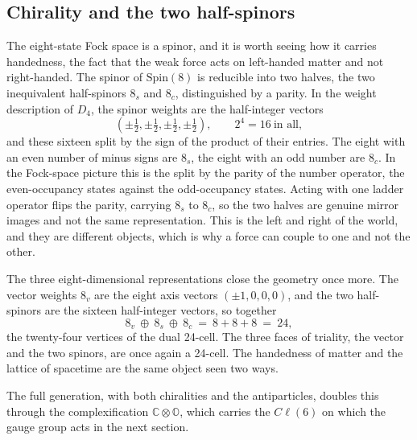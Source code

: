 \subsection{Chirality and the two half-spinors}

The eight-state Fock space is a spinor, and it is worth seeing how it carries handedness, the fact that the weak force
acts on left-handed matter and not right-handed. The spinor of $\mathrm{Spin}(8)$ is reducible into two halves, the two
inequivalent half-spinors $8_s$ and $8_c$, distinguished by a parity. In the weight description of $D_4$, the spinor
weights are the half-integer vectors
\begin{equation}
  \left( \pm\tfrac12, \pm\tfrac12, \pm\tfrac12, \pm\tfrac12 \right), \qquad 2^4 = 16 \ \text{in all},
\end{equation}
and these sixteen split by the sign of the product of their entries. The eight with an even number of minus signs are
$8_s$, the eight with an odd number are $8_c$. In the Fock-space picture this is the split by the parity of the number
operator, the even-occupancy states against the odd-occupancy states. Acting with one ladder operator flips the parity,
carrying $8_s$ to $8_c$, so the two halves are genuine mirror images and not the same representation. This is the
left and right of the world, and they are different objects, which is why a force can couple to one and not the other.

The three eight-dimensional representations close the geometry once more. The vector weights $8_v$ are the eight axis
vectors $(\pm 1, 0, 0, 0)$, and the two half-spinors are the sixteen half-integer vectors, so together
\begin{equation}
  8_v \ \oplus\ 8_s \ \oplus\ 8_c \ = \ 8 + 8 + 8 \ = \ 24,
\end{equation}
the twenty-four vertices of the dual 24-cell. The three faces of triality, the vector and the two spinors, are once
again a 24-cell. The handedness of matter and the lattice of spacetime are the same object seen two ways.

The full generation, with both chiralities and the antiparticles, doubles this through the complexification $\mathbb{C}
\otimes \mathbb{O}$, which carries the $C\ell(6)$ on which the gauge group acts in the next section.
